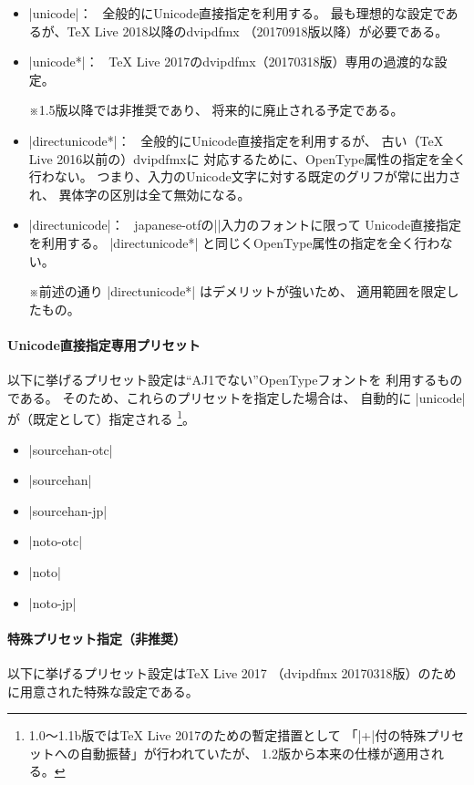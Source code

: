 \documentclass[uplatex,dvipdfmx,a4paper]{jsarticle}
\newcommand{\Pkg}[1]{\textsf{#1}}
\newcommand{\Note}{\par\noindent ※}
\newcommand{\Means}{：\ }
\providecommand{\Strong}[1]{\textsf{#1}}
\begin{document}
\begin{itemize}
\item |unicode|\Means
  全般的にUnicode直接指定を利用する。
  最も理想的な設定であるが、\Strong{{\TeX} Live 2018以降のdvipdfmx}%
  （20170918版以降）が必要である。
\item |unicode*|\Means
  {\TeX} Live 2017のdvipdfmx（20170318版）専用の\Strong{過渡的}な設定。
  \Note 1.5版以降では\Strong{非推奨}であり、
  将来的に廃止される予定である。
\item |directunicode*|\Means
  全般的にUnicode直接指定を利用するが、
  古い（{\TeX} Live 2016以前の）dvipdfmxに
  対応するために、OpenType属性の指定を全く行わない。
  つまり、入力のUnicode文字に対する既定のグリフが常に出力され、
  異体字の区別は全て無効になる。
\item |directunicode|\Means
  \Pkg{japanese-otf}の|\UTF|入力のフォントに限って
  Unicode直接指定を利用する。
  |directunicode*| と同じくOpenType属性の指定を全く行わない。
  \Note 前述の通り |directunicode*| はデメリットが強いため、
  適用範囲を限定したもの。
\end{itemize}

\paragraph{Unicode直接指定専用プリセット}

以下に挙げるプリセット設定は“AJ1でない”OpenTypeフォントを
利用するものである。
そのため、これらのプリセットを指定した場合は、
自動的に |unicode| が（既定として）指定される%
\footnote{1.0～1.1b版では{\TeX} Live 2017のための暫定措置として
「|+|付の特殊プリセットへの自動振替」が行われていたが、
1.2版から本来の仕様が適用される。}。

\begin{itemize}
\item |sourcehan-otc|
\item |sourcehan|
\item |sourcehan-jp|
\item |noto-otc|
\item |noto|
\item |noto-jp|
\end{itemize}

\paragraph{特殊プリセット指定\<（非推奨）}

以下に挙げるプリセット設定は{\TeX} Live 2017%
（dvipdfmx 20170318版）のために用意された特殊な設定である。
\end{document}
